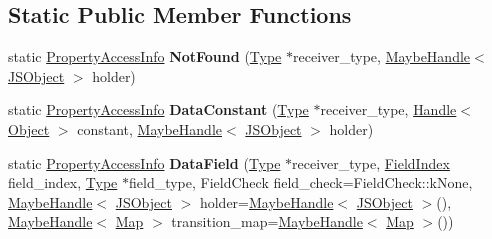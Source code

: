 \subsection*{Static Public Member Functions}
\begin{DoxyCompactItemize}
\item 
static \hyperlink{classv8_1_1internal_1_1compiler_1_1_property_access_info}{Property\+Access\+Info} {\bfseries Not\+Found} (\hyperlink{classv8_1_1internal_1_1_type}{Type} $\ast$receiver\+\_\+type, \hyperlink{classv8_1_1internal_1_1_maybe_handle}{Maybe\+Handle}$<$ \hyperlink{classv8_1_1internal_1_1_j_s_object}{J\+S\+Object} $>$ holder)\hypertarget{classv8_1_1internal_1_1compiler_1_1_property_access_info_a713e07abfdccafe568179693196e24a9}{}\label{classv8_1_1internal_1_1compiler_1_1_property_access_info_a713e07abfdccafe568179693196e24a9}

\item 
static \hyperlink{classv8_1_1internal_1_1compiler_1_1_property_access_info}{Property\+Access\+Info} {\bfseries Data\+Constant} (\hyperlink{classv8_1_1internal_1_1_type}{Type} $\ast$receiver\+\_\+type, \hyperlink{classv8_1_1internal_1_1_handle}{Handle}$<$ \hyperlink{classv8_1_1internal_1_1_object}{Object} $>$ constant, \hyperlink{classv8_1_1internal_1_1_maybe_handle}{Maybe\+Handle}$<$ \hyperlink{classv8_1_1internal_1_1_j_s_object}{J\+S\+Object} $>$ holder)\hypertarget{classv8_1_1internal_1_1compiler_1_1_property_access_info_a4363aa1035f8d184324bb5439b153ee7}{}\label{classv8_1_1internal_1_1compiler_1_1_property_access_info_a4363aa1035f8d184324bb5439b153ee7}

\item 
static \hyperlink{classv8_1_1internal_1_1compiler_1_1_property_access_info}{Property\+Access\+Info} {\bfseries Data\+Field} (\hyperlink{classv8_1_1internal_1_1_type}{Type} $\ast$receiver\+\_\+type, \hyperlink{classv8_1_1internal_1_1_field_index}{Field\+Index} field\+\_\+index, \hyperlink{classv8_1_1internal_1_1_type}{Type} $\ast$field\+\_\+type, Field\+Check field\+\_\+check=Field\+Check\+::k\+None, \hyperlink{classv8_1_1internal_1_1_maybe_handle}{Maybe\+Handle}$<$ \hyperlink{classv8_1_1internal_1_1_j_s_object}{J\+S\+Object} $>$ holder=\hyperlink{classv8_1_1internal_1_1_maybe_handle}{Maybe\+Handle}$<$ \hyperlink{classv8_1_1internal_1_1_j_s_object}{J\+S\+Object} $>$(), \hyperlink{classv8_1_1internal_1_1_maybe_handle}{Maybe\+Handle}$<$ \hyperlink{classv8_1_1internal_1_1_map}{Map} $>$ transition\+\_\+map=\hyperlink{classv8_1_1internal_1_1_maybe_handle}{Maybe\+Handle}$<$ \hyperlink{classv8_1_1internal_1_1_map}{Map} $>$())\hypertarget{classv8_1_1internal_1_1compiler_1_1_property_access_info_afd78ca0493131a5a4d831ac66063806b}{}\label{classv8_1_1internal_1_1compiler_1_1_property_access_info_afd78ca0493131a5a4d831ac66063806b}

\end{DoxyCompactItemize}
